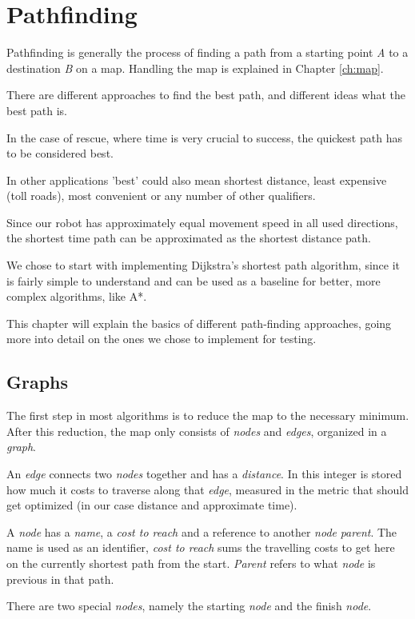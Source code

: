 \chapter{Pathfinding}\label{ch:path}
Pathfinding is generally the process of finding a path from a starting point \emph{A}
to a destination \emph{B}
on a map.
Handling the map is explained in Chapter \ref{ch:map}.

There are different approaches to find the best path,
and different ideas what the best path is.

In the case of rescue, where time is very crucial to success,
the quickest path has to be considered best. \cite{Zipes2506}

In other applications 'best' could also mean shortest distance, least expensive (toll roads),
most convenient or any number of other qualifiers.

Since our robot has approximately equal movement speed in all used directions,
the shortest time path can be approximated as the shortest distance path.

We chose to start with implementing Dijkstra's shortest path algorithm,
since it is fairly simple to understand and can be used as a baseline for better,
more complex algorithms, like A*.

This chapter will explain the basics of different path-finding approaches,
going more into detail on the ones we chose to implement for testing.

\section{Graphs}
The first step in most algorithms is to reduce the map to the necessary minimum.
After this reduction, the map only consists of \emph{nodes} and \emph{edges},
organized in a \emph{graph}.

An \emph{edge} connects two \emph{nodes} together and has a \emph{distance}.
In this integer is stored how much it costs to traverse along that \emph{edge},
measured in the metric that should get optimized (in our case distance and approximate time).

A \emph{node} has a \emph{name}, a \emph{cost to reach} and a reference to another \emph{node} \emph{parent}.
The name is used as an identifier,
\emph{cost to reach} sums the travelling costs to get here on the currently shortest path from the start.
\emph{Parent} refers to what \emph{node} is previous in that path.

There are two special \emph{nodes}, namely the starting \emph{node} and the finish \emph{node}.


